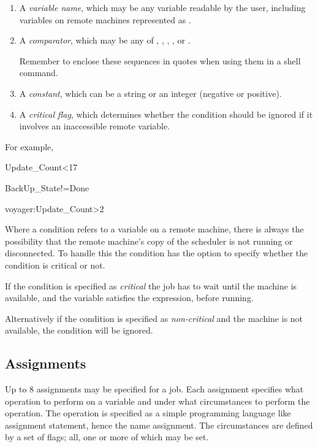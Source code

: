 \begin{enumerate}
\item A \textit{variable name}, which may be any variable readable by the user, including variables on remote machines represented as
.
\item A \textit{comparator}, which may be any of \exampletext{=}, \exampletext{!=}, \exampletext{{\textless}}, \exampletext{{\textless}=},
\exampletext{{\textgreater}} or \exampletext{{\textgreater}=}.

Remember to enclose these sequences in quotes when using them in a shell command.
\item A \textit{constant}, which can be a string or an integer (negative or positive).
\item A \textit{critical flag}, which determines whether the condition should be ignored if it involves an inaccessible remote variable.
\end{enumerate}
For example,

\begin{expara}

Update\_Count{\textless}17

BackUp\_State!=Done

voyager:Update\_Count{\textgreater}2

\end{expara}

Where a condition refers to a variable on a remote machine, there is always the possibility that the remote machine's copy of the scheduler
is not running or disconnected. To handle this the condition has the option to specify whether the condition is critical or not.

If the condition is specified as \textit{critical} the job has to wait until the machine is available, and the variable satisfies the
expression, before running.

Alternatively if the condition is specified as \textit{non-critical} and the machine is not available, the condition will be ignored.

\subsection{Assignments}
Up to 8 assignments may be specified for a job. Each assignment specifies what operation to perform on a variable and under what
circumstances to perform the operation. The operation is specified as a simple programming language like assignment statement, hence the name
assignment. The circumstances are defined by a set of flags; all, one or more of which may be set.

